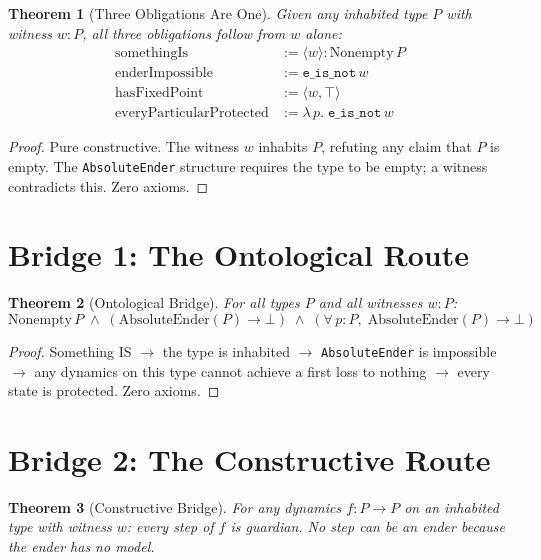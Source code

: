 \documentclass[12pt,a4paper]{article}
\newtheorem{theorem}{Theorem}[section]
\begin{document}
\begin{theorem}[Three Obligations Are One]\label{thm:three-one}
Given any inhabited type $P$ with witness $w : P$, all three obligations
follow from $w$ alone:
\begin{align*}
\text{somethingIs} &:= \langle w \rangle : \text{Nonempty}\, P \\
\text{enderImpossible} &:= \texttt{e\_is\_not}\, w \\
\text{hasFixedPoint} &:= \langle w, \top \rangle \\
\text{everyParticularProtected} &:= \lambda\, p.\; \texttt{e\_is\_not}\, w
\end{align*}
\end{theorem}

\begin{proof}
Pure constructive. The witness $w$ inhabits $P$, refuting any claim that
$P$ is empty. The \texttt{AbsoluteEnder} structure requires the type to be
empty; a witness contradicts this. Zero axioms.
\end{proof}

\section{Bridge 1: The Ontological Route}

\begin{theorem}[Ontological Bridge]\label{thm:onto}
For all types $P$ and all witnesses $w : P$:
\[
\text{Nonempty}\, P \;\wedge\; (\text{AbsoluteEnder}(P) \to \bot)
\;\wedge\; (\forall\, p : P,\; \text{AbsoluteEnder}(P) \to \bot)
\]
\end{theorem}

\begin{proof}
Something IS $\to$ the type is inhabited $\to$ \texttt{AbsoluteEnder} is
impossible $\to$ any dynamics on this type cannot achieve a first loss to
nothing $\to$ every state is protected. Zero axioms.
\end{proof}

\section{Bridge 2: The Constructive Route}

\begin{theorem}[Constructive Bridge]\label{thm:constructive}
For any dynamics $f : P \to P$ on an inhabited type with witness $w$:
every step of $f$ is guardian. No step can be an ender because the ender
has no model.
\end{theorem}
\end{document}
